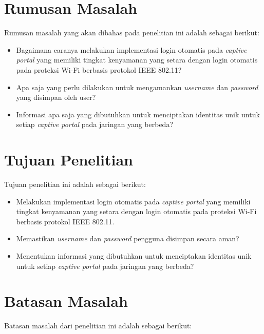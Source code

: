 \section{Rumusan Masalah}
\label{sec:rumusan_masalah}

Rumusan masalah yang akan dibahas pada penelitian ini adalah sebagai berikut:

\begin{itemize}
	\item{Bagaimana caranya melakukan implementasi login otomatis pada \textit{captive portal} yang memiliki tingkat kenyamanan yang setara dengan login otomatis pada proteksi Wi-Fi berbasis protokol IEEE 802.11?}
	\item{Apa saja yang perlu dilakukan untuk mengamankan \textit{username} dan \textit{password} yang disimpan oleh user?}
	\item{Informasi apa saja yang dibutuhkan untuk menciptakan identitas unik untuk setiap \textit{captive portal} pada jaringan yang berbeda?}
\end{itemize}



\section{Tujuan Penelitian}
\label{sec:tujuan_penelitian}

Tujuan penelitian ini adalah sebagai berikut:

\begin{itemize}
	\item{Melakukan implementasi login otomatis pada \textit{captive portal} yang memiliki tingkat kenyamanan yang setara dengan login otomatis pada proteksi Wi-Fi berbasis protokol IEEE 802.11.}
	\item{Memastikan \textit{username} dan \textit{password} pengguna disimpan secara aman?}
	\item{Menentukan informasi yang dibutuhkan untuk menciptakan identitas unik untuk setiap \textit{captive portal} pada jaringan yang berbeda?}
\end{itemize}



\section{Batasan Masalah}
\label{sec:batasan_masalah}

Batasan masalah dari penelitian ini adalah sebagai berikut:

